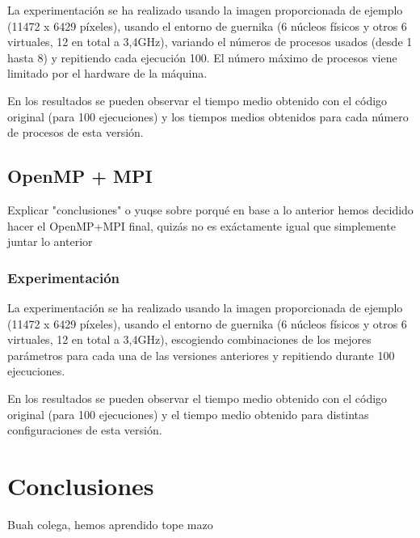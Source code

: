 \documentclass[12pt]{report} %
\begin{document}
La experimentación se ha realizado usando la imagen proporcionada de ejemplo (11472 x 6429 píxeles),
usando el entorno de guernika (6 núcleos físicos y otros 6 virtuales, 12 en total a 3,4GHz), variando
el números de procesos usados (desde 1 hasta 8) y repitiendo cada ejecución 100. El número máximo
de procesos viene limitado por el hardware de la máquina.

En los resultados se pueden observar el tiempo medio obtenido con el código original (para 100 ejecuciones)
y los tiempos medios obtenidos para cada número de procesos de esta versión.

\section{OpenMP + MPI}
\label{sec:OpenMP+MPI}
Explicar "conclusiones" o yuqse sobre porqué en base a lo anterior hemos decidido hacer el OpenMP+MPI final, quizás no es exáctamente igual que simplemente juntar lo anterior


\subsection{Experimentación}

La experimentación se ha realizado usando la imagen proporcionada de ejemplo (11472 x 6429 píxeles),
usando el entorno de guernika (6 núcleos físicos y otros 6 virtuales, 12 en total a 3,4GHz), escogiendo
combinaciones de los mejores parámetros para cada una de las versiones anteriores y repitiendo
durante 100 ejecuciones.

En los resultados se pueden observar el tiempo medio obtenido con el código original (para 100 ejecuciones)
y el tiempo medio obtenido para distintas configuraciones de esta versión.

\chapter{Conclusiones}

Buah colega, hemos aprendido tope mazo




\nocite{*} %

\clearpage
{}
\printbibliography
\end{document}
